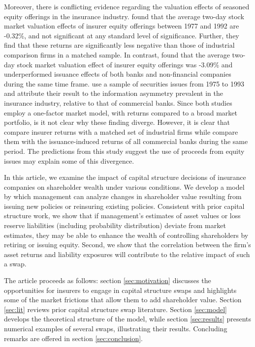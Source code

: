 Moreover, there is conflicting evidence regarding the valuation effects of seasoned equity offerings in the insurance industry.  \citet{akhigbe1997a} found that the average two-day stock market valuation effects of insurer equity offerings between 1977 and 1992 are -0.32\%, and not significant at any standard level of significance.  Further, they find that these returns are significantly less negative than those of industrial comparison firms in a matched sample. In contrast, \citet{polonchek1995a} found that the average two-day stock market valuation effect of insurer equity offerings was -3.09\% and underperformed issuance effects of both banks and non-financial companies during the same time frame. \citet{polonchek1995a} use a sample of securities issues from 1975 to 1993 and attribute their result to the information asymmetry prevalent in the insurance industry, relative to that of commercial banks.  Since both studies employ a one-factor market model, with returns compared to a broad market portfolio, is it not clear why these finding diverge.  However, it is clear that \citet{akhigbe1997a} compare insurer returns with a matched set of industrial firms while \citet{polonchek1995a} compare them with the issuance-induced returns of all commercial banks during the same period. The predictions from this study suggest the use of proceeds from equity issues may explain some of this divergence.

In this article, we examine the impact of capital structure decisions of insurance companies on shareholder wealth under various conditions. We develop a model by which management can analyze changes in shareholder value resulting from issuing new policies or reinsuring existing policies. Consistent with prior capital structure work, we show that if management's estimates of asset values or loss reserve liabilities (including probability distribution) deviate from market estimates, they may be able to enhance the wealth of controlling shareholders by retiring or issuing equity. Second, we show that the correlation between the firm's asset returns and liability exposures will contribute to the relative impact of such a swap. 

The article proceeds as follows: section \ref{sec:motivation} discusses the opportunities for insurers to engage in capital structure swaps and highlights some of the market frictions that allow them to add shareholder value.  Section \ref{sec:lit} reviews prior capital structure swap literature. Section \ref{sec:model} develops the theoretical structure of the model, while section \ref{sec:results} presents numerical examples of several swaps, illustrating their results. Concluding remarks are offered in section \ref{sec:conclusion}.

